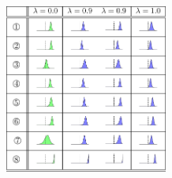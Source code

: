 \documentclass[10pt,twoside,lineno]{article}
\begin{document}
\begin{table}[hbt!]

	\begin{center}
\includegraphics[width=0.4\textwidth]{si-table-perrel-3-1.png}  
\end{center}


\end{table}
\end{document}
